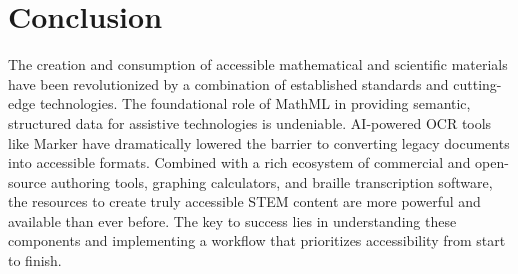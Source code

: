 \section{Conclusion}\label{ch11:sec:conclusion}
The creation and consumption of accessible mathematical and scientific materials have been revolutionized by a combination of established standards and cutting-edge technologies. The foundational role of \gls{MathML} in providing semantic, structured data for assistive technologies is undeniable. \gls{AI}-powered \gls{OCR} tools like Marker have dramatically lowered the barrier to converting legacy documents into accessible formats. Combined with a rich ecosystem of commercial and open-source authoring tools, graphing calculators, and braille transcription software, the resources to create truly accessible STEM content are more powerful and available than ever before. The key to success lies in understanding these components and implementing a workflow that prioritizes accessibility from start to finish.

